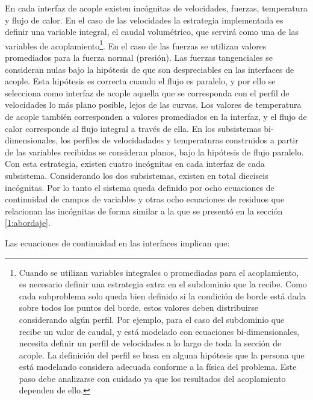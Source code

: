 En cada interfaz de acople existen incógnitas de velocidades, fuerzas, temperatura y flujo de calor.
En el caso de las velocidades la estrategia implementada es definir una variable integral, 
el caudal volumétrico, que servirá como una de las variables de acoplamiento\footnote{
Cuando se utilizan variables integrales o promediadas para el acoplamiento, es necesario definir una estrategia extra en el subdominio que la recibe.
Como cada subproblema solo queda bien definido si la condición de borde está dada sobre todos los puntos del borde, estos valores deben distribuirse considerando algún perfil.
Por ejemplo, para el caso del subdominio que recibe un valor de caudal, y está modelado con ecuaciones bi-dimensionales, necesita definir un perfil de velocidades a lo largo de toda la sección de acople.
La definición del perfil se basa en alguna hipótesis que la persona que está modelando considera adecuada conforme a la física del problema.
Este paso debe analizarse con cuidado ya que los resultados del acoplamiento dependen de ello.
}.
En el caso de las fuerzas se utilizan valores promediados para la fuerza normal (presión).
Las fuerzas tangenciales se consideran nulas bajo la hipótesis de que son despreciables en las interfaces de acople.
Esta hipótesis es correcta cuando el flujo es paralelo, 
y por ello se selecciona como interfaz de acople aquella que se corresponda con el perfil de velocidades lo más plano posible, lejos de las curvas.
Los valores de temperatura de acople también corresponden a valores promediados en la interfaz,
y el flujo de calor corresponde al flujo integral a través de ella.
En los subsistemas bi-dimensionales, los perfiles de velocidadades y temperaturas construidos a partir de las variables recibidas se consideran planos,
bajo la hipótesis de flujo paralelo.
Con esta estrategia, existen cuatro incógnitas en cada interfaz de cada subsistema. 
Considerando los dos subsistemas, existen en total dieciseis incógnitas.
Por lo tanto el sistema queda definido por ocho ecuaciones de continuidad de campos de variables
y otras ocho ecuaciones de residuos que relacionan las incógnitas de forma similar 
a la que se presentó en la sección \ref{1:abordaje}.

Las ecuaciones de continuidad en las interfaces implican que:

